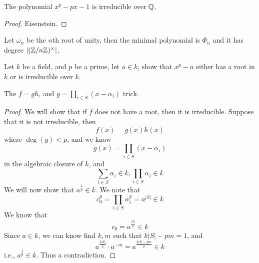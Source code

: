 \begin{prop}
    The polynomial $x^p-px-1$ is irreducible over $\mathbb{Q}$.
\end{prop}
\begin{proof}
    Eisenstein.
\end{proof}

\begin{prop}
    Let $\omega_n$ be the $n$th root of unity, then the minimal polynomial is $\Phi_n$ and it has degree $|(\mathbb{Z}/n\mathbb{Z})^\times|$. 
\end{prop}


\begin{prob}[S2006-Q4]
    Let $k$ be a field, and $p$ be a prime, let $a\in k$, show that $x^p-a$ either has a root in $k$ or is irreducible over $k$.
\end{prob}
\begin{warn}
    The $f=gh$, and $g=\prod_{i\in S}(x-\alpha_i)$ trick.
\end{warn}
\begin{proof}
    We will show that if $f$ does not have a root, then it is irreducible. Suppose that it is not irreducible, then 
    \begin{equation*}
        f(x)=g(x)h(x)
    \end{equation*}
    where $\deg(g)<p$, and we know 
    \begin{equation*}
        g(x)=\prod_{i\in S}(x-\alpha_i)
    \end{equation*}
    in the algebraic closure of $k$, and 
    \begin{equation*}
        \sum_{i\in S}\alpha_i\in k, \prod_{i\in S}\alpha_i\in k
    \end{equation*}
    We will now show that $a^\frac{1}{p}\in k$. We note that 
    \begin{equation*}
        c_0^p=\prod_{i\in S}\alpha_i^p=a^{|S|}\in k
    \end{equation*}
    We know that 
    \begin{equation*}
        c_0=a^\frac{|S|}{p}\in k
    \end{equation*}
    Since $a\in k$, we can know find $k, m$ such that $k|S|-pm=1$, and 
    \begin{equation*}
        a^\frac{k|S|}{p}\cdot a^{-m}=a^{\frac{k|S|-pm}{p}}\in k
    \end{equation*}
    i.e., $a^\frac{1}{p}\in k$. Thus a contradiction.
\end{proof}



